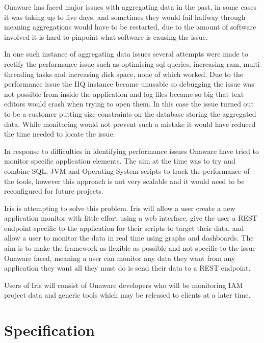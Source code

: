 \documentclass[12pt,a4paper,titlepage]{report}
\begin{document}
Onaware has faced major issues with aggregating data in the past, in some cases it was taking up to five days, and sometimes they would fail halfway through meaning aggregations would have to be restarted, due to the amount of software involved it is hard to pinpoint what software is causing the issue.

In one such instance of aggregating data issues several attempts were made to rectify the performance issue such as optimising sql queries, increasing ram, multi threading tasks and increasing disk space, none of which worked. Due to the performance issue the IIQ instance became unusable so debugging the issue was not possible from inside the application and log files became so big that text editors would crash when trying to open them. In this case the issue turned out to be a customer putting size constraints on the database storing the aggregated data. While monitoring would not prevent such a mistake it would have reduced the time needed to locate the issue. 

In response to difficulties in identifying performance issues Onaware have tried to monitor specific application elements. The aim at the time was to try and combine SQL, JVM and Operating System scripts to track the performance of the tools, however this approach is not very scalable and it would need to be reconfigured for future projects. 

Iris is attempting to solve this problem. Iris will allow a user create a new application monitor with little effort using a web interface, give the user a REST endpoint specific to the application for their scripts to target their data, and allow a user to monitor the data in real time using graphs and dashboards. The aim is to make the framework as flexible as possible and not specific to the issue Onaware faced, meaning a user can monitor any data they want from any application they want all they must do is send their data to a REST endpoint.

Users of Iris will consist of Onaware developers who will be monitoring IAM project data and generic tools which may be released to clients at a later time.

\chapter{Specification}
\end{document}
